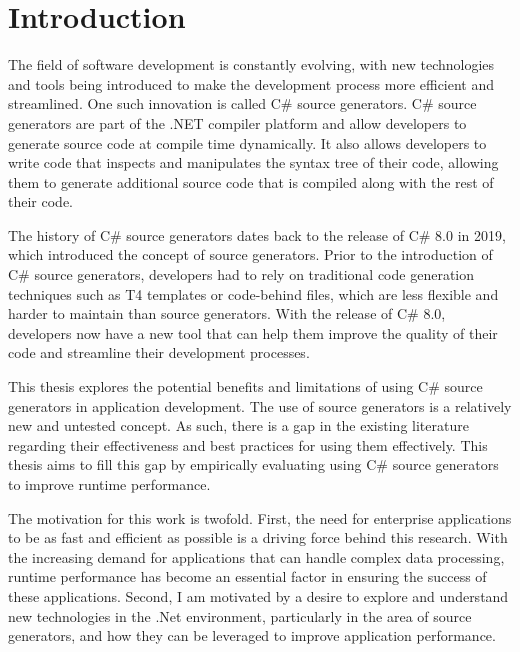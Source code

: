 \chapter{Introduction}

The field of software development is constantly evolving, with new technologies and tools being introduced to make the development process more efficient and streamlined. One such innovation is called C\# source generators. C\# source generators are part of the .NET compiler platform and allow developers to generate source code at compile time dynamically. It also allows developers to write code that inspects and manipulates the syntax tree of their code, allowing them to generate additional source code that is compiled along with the rest of their code.

The history of C\# source generators dates back to the release of C\# 8.0 in 2019, which introduced the concept of source generators. Prior to the introduction of C\# source generators, developers had to rely on traditional code generation techniques such as T4 templates or code-behind files, which are less flexible and harder to maintain than source generators. With the release of C\# 8.0, developers now have a new tool that can help them improve the quality of their code and streamline their development processes.

This thesis explores the potential benefits and limitations of using C\# source generators in application development. The use of source generators is a relatively new and untested concept. As such, there is a gap in the existing literature regarding their effectiveness and best practices for using them effectively. This thesis aims to fill this gap by empirically evaluating using C\# source generators to improve runtime performance.

The motivation for this work is twofold. First, the need for enterprise applications to be as fast and efficient as possible is a driving force behind this research. With the increasing demand for applications that can handle complex data processing, runtime performance has become an essential factor in ensuring the success of these applications. Second, I am motivated by a desire to explore and understand new technologies in the .Net environment, particularly in the area of source generators, and how they can be leveraged to improve application performance.

